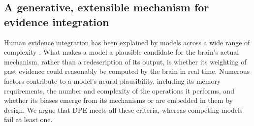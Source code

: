 \documentclass[12pt]{article}
\begin{document}

\subsection{A generative, extensible mechanism for evidence integration}
Human evidence integration has been explained by models across a wide range of complexity \cite{gallistel2014perception, zhu2020bayesian, degroot1974reaching, parpart2018heuristics, raviv2012recent, usher2001time, glaze2015normative, piray2021model, zhang2014sequential, cain2012computational, gibson1997learning, waskom2018decision, kopec2024integrate, prat2024imprecise}. What makes a model a plausible candidate for the brain's actual mechanism, rather than a redescription of its output, is whether its weighting of past evidence could reasonably be computed by the brain in real time. Numerous factors contribute to a model's neural plausibility, including its memory requirements, the number and complexity of the operations it performs, and whether its biases emerge from its mechanisms or are embedded in them by design. We argue that DPE meets all these criteria, whereas competing models fail at least one.
\end{document}
